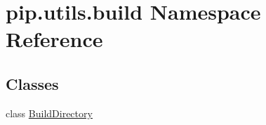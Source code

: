\hypertarget{namespacepip_1_1utils_1_1build}{}\section{pip.\+utils.\+build Namespace Reference}
\label{namespacepip_1_1utils_1_1build}
\subsection*{Classes}
\begin{DoxyCompactItemize}
\item 
class \hyperlink{classpip_1_1utils_1_1build_1_1_build_directory}{Build\+Directory}
\end{DoxyCompactItemize}
